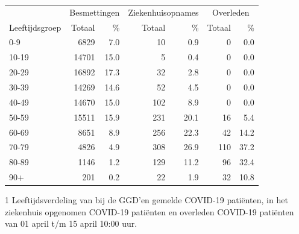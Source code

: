\documentclass[
  english,
  man,floatsintext]{apa6}
\begin{document}
\begin{table}
\centering\begingroup\fontsize{11}{13}\selectfont

\begin{threeparttable}
\begin{tabular}{lrrrrrr}
\toprule
\multicolumn{1}{c}{ } & \multicolumn{2}{c}{Besmettingen} & \multicolumn{2}{c}{Ziekenhuisopnames} & \multicolumn{2}{c}{Overleden} \\
\cmidrule(l{3pt}r{3pt}){2-3} \cmidrule(l{3pt}r{3pt}){4-5} \cmidrule(l{3pt}r{3pt}){6-7}
Leeftijdsgroep & Totaal & \% & Totaal & \% & Totaal & \%\\
\midrule
0-9 & 6829 & 7.0 & 10 & 0.9 & 0 & 0.0\\
10-19 & 14701 & 15.0 & 5 & 0.4 & 0 & 0.0\\
20-29 & 16892 & 17.3 & 32 & 2.8 & 0 & 0.0\\
30-39 & 14269 & 14.6 & 52 & 4.5 & 0 & 0.0\\
40-49 & 14670 & 15.0 & 102 & 8.9 & 0 & 0.0\\
50-59 & 15511 & 15.9 & 231 & 20.1 & 16 & 5.4\\
60-69 & 8651 & 8.9 & 256 & 22.3 & 42 & 14.2\\
70-79 & 4826 & 4.9 & 308 & 26.9 & 110 & 37.2\\
80-89 & 1146 & 1.2 & 129 & 11.2 & 96 & 32.4\\
90+ & 201 & 0.2 & 22 & 1.9 & 32 & 10.8\\
\bottomrule
\end{tabular}
\begin{tablenotes}
\item[1] Leeftijdsverdeling van bij de GGD’en gemelde COVID-19 patiënten, in het ziekenhuis opgenomen COVID-19 patiënten en overleden COVID-19 patiënten van 01 april t/m 15 april 10:00 uur.
\end{tablenotes}
\end{threeparttable}
\endgroup{}
\end{table}

\newpage
\end{document}
